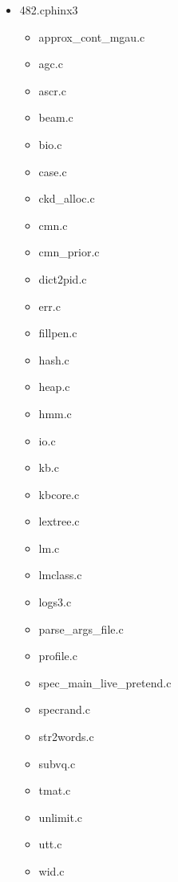 \begin{multicols}{3}
\begin{itemize}
	\item 482.cphinx3
	\begin{itemize}
		\item approx\_cont\_mgau.c
		\item agc.c
		\item ascr.c
		\item beam.c
		\item bio.c
		\item case.c
		\item ckd\_alloc.c
		\item cmn.c
		\item cmn\_prior.c
		\item dict2pid.c
		\item err.c
		\item fillpen.c
		\item hash.c
		\item heap.c
		\item hmm.c
		\item io.c
		\item kb.c
		\item kbcore.c
		\item lextree.c
		\item lm.c
		\item lmclass.c
		\item logs3.c
		\item parse\_args\_file.c
		\item profile.c
		\item spec\_main\_live\_pretend.c
		\item specrand.c
		\item str2words.c
		\item subvq.c
		\item tmat.c
		\item unlimit.c
		\item utt.c
		\item wid.c
	\end{itemize}
\end{itemize}
\end{multicols}
